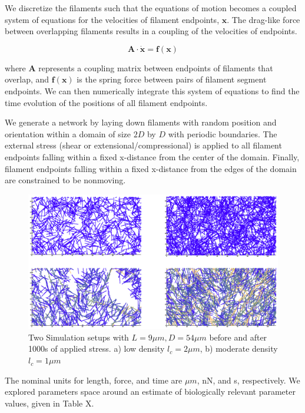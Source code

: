 \documentclass[pre,reprint]{revtex4-1}
\begin{document}
We discretize the filaments such that the equations of motion becomes a coupled system of equations for the velocities of filament endpoints, $\mathbf{x}$.  The drag-like force between overlapping filaments results in a coupling of the velocities of endpoints.  

\begin{equation}
\mathbf{A \cdot \dot x} = \mathbf{f(x)}
\end{equation}

where $\mathbf{A }$ represents a coupling matrix between endpoints of filaments that overlap, and $\mathbf{f(x)}$ is the spring force between pairs of filament segment endpoints.  We can then numerically integrate this system of equations to find the time evolution of the positions of all filament endpoints.

We generate a network by laying down filaments with random position and orientation within a domain of size $2D$ by $D$ with periodic boundaries.  The external stress (shear or extensional/compressional) is applied to all filament endpoints falling within a fixed x-distance from the center of the domain.  Finally, filament endpoints falling within a fixed x-distance from the edges of the domain are constrained to be nonmoving.

\begin{figure}[h!]
\centering
\includegraphics[width=\hsize]{network_def}
\caption{\label{fig:sim}Two Simulation setups with $L=9 \mu m, D = 54 \mu m$ before and after 1000s of applied stress. a) low density $l_c=2 \mu m$, b) moderate density $l_c=1 \mu m$ }
\end{figure}

The nominal units for length, force, and time are $\mu m$, nN, and s, respectively.  We explored parameters space around an estimate of biologically relevant parameter values, given in Table X. 
\end{document}
